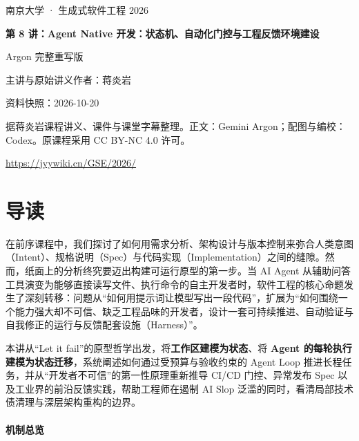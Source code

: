\documentclass[UTF8,a4paper,11pt,fontset=fandol]{ctexart}
\begin{document}
\begin{titlepage}\centering\vspace*{25mm}

{\Large 南京大学 · 生成式软件工程 2026\par}\vspace{12mm}

{\Huge\bfseries 第 8 讲：Agent Native 开发：状态机、自动化门控与工程反馈环境建设\par}\vspace{10mm}

{\Large Argon 完整重写版\par}\vspace{10mm}

主讲与原始讲义作者：蒋炎岩\par

资料快照：2026-10-20\par\vfill

据蒋炎岩课程讲义、课件与课堂字幕整理。正文：Gemini Argon；配图与编校：Codex。原课程采用 CC BY-NC 4.0 许可。

\vspace{8mm}\url{https://jyywiki.cn/GSE/2026/}

\end{titlepage}

\tableofcontents\clearpage

\section*{导读}

在前序课程中，我们探讨了如何用需求分析、架构设计与版本控制来弥合人类意图（Intent）、规格说明（Spec）与代码实现（Implementation）之间的缝隙。然而，纸面上的分析终究要迈出构建可运行原型的第一步。当 AI Agent 从辅助问答工具演变为能够直接读写文件、执行命令的自主开发者时，软件工程的核心命题发生了深刻转移：问题从“如何用提示词让模型写出一段代码”，扩展为“如何围绕一个能力强大却不可信、缺乏工程品味的开发者，设计一套可持续推进、自动验证与自我修正的运行与反馈配套设施（Harness）”。

本讲从“Let it fail”的原型哲学出发，将\textbf{工作区建模为状态}、将 \textbf{Agent 的每轮执行建模为状态迁移}，系统阐述如何通过受预算与验收约束的 Agent Loop 推进长程任务，并从“开发者不可信”的第一性原理重新推导 CI/CD 门控、异常发布 Spec 以及工业界的前沿反馈实践，帮助工程师在遏制 AI Slop 泛滥的同时，看清局部技术债清理与深层架构重构的边界。

\paragraph{机制总览}
\end{document}
